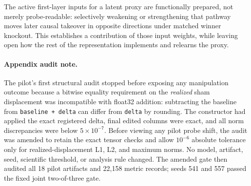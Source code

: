 \begin{takeaway}
The active first-layer inputs for a latent proxy are functionally prepared, not merely probe-readable: selectively weakening or strengthening that pathway moves later causal takeover in opposite directions under matched winner knockout. This establishes a contribution of those input weights, while leaving open how the rest of the representation implements and relearns the proxy.
\end{takeaway}

\paragraph{Appendix audit note.}
The pilot's first structural audit stopped before exposing any manipulation
outcome because a bitwise equality requirement on the \emph{realized} sham
displacement was incompatible with float32 addition: subtracting the baseline
from \texttt{baseline + delta} can differ from \texttt{delta} by rounding. The
constructor had applied the exact registered delta, final edited columns were
exact, and all norm discrepancies were below $5\times10^{-7}$. Before viewing
any pilot probe shift, the audit was amended to retain the exact tensor checks
and allow $10^{-6}$ absolute tolerance only for realized-displacement L1, L2,
and maximum norms. No model, artifact, seed, scientific threshold, or analysis
rule changed. The amended gate then audited all 18 pilot artifacts and 22,158
metric records; seeds 541 and 557 passed the fixed joint two-of-three gate.
